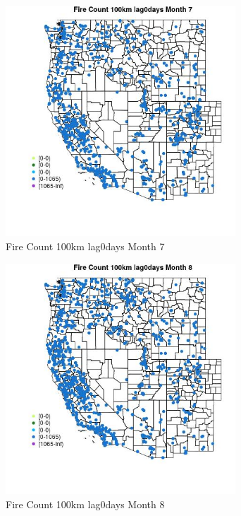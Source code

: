 \begin{figure} 
\centering  
\includegraphics[width=0.77\textwidth]{Code_Outputs/Report_ML_input_PM25_Step4_part_f_de_duplicated_aveswNAs_MapObsMo7Fire_Count_100km_lag0days.jpg} 
\caption{\label{fig:Report_ML_input_PM25_Step4_part_f_de_duplicated_aveswNAsMapObsMo7Fire_Count_100km_lag0days}Fire Count 100km lag0days Month 7} 
\end{figure} 
 

\begin{figure} 
\centering  
\includegraphics[width=0.77\textwidth]{Code_Outputs/Report_ML_input_PM25_Step4_part_f_de_duplicated_aveswNAs_MapObsMo8Fire_Count_100km_lag0days.jpg} 
\caption{\label{fig:Report_ML_input_PM25_Step4_part_f_de_duplicated_aveswNAsMapObsMo8Fire_Count_100km_lag0days}Fire Count 100km lag0days Month 8} 
\end{figure} 
 

